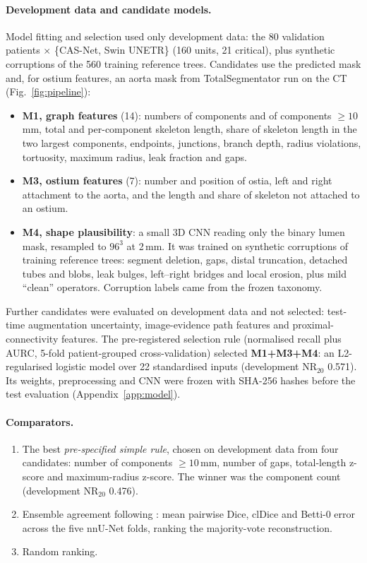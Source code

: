\documentclass[11pt]{article}
\newcommand{\NR}{\mathrm{NR}_{20}}
\begin{document}
\paragraph{Development data and candidate models.} Model fitting and selection used only development data: the 80 validation patients $\times$ \{CAS-Net, Swin UNETR\} (160 units, 21 critical), plus synthetic corruptions of the 560 training reference trees. Candidates use the predicted mask and, for ostium features, an aorta mask from TotalSegmentator \citep{wasserthal2023totalseg} run on the CT (Fig.~\ref{fig:pipeline}):
\begin{itemize}
\item \textbf{M1, graph features} (14): numbers of components and of components $\geq 10$\,mm, total and per-component skeleton length, share of skeleton length in the two largest components, endpoints, junctions, branch depth, radius violations, tortuosity, maximum radius, leak fraction and gaps.
\item \textbf{M3, ostium features} (7): number and position of ostia, left and right attachment to the aorta, and the length and share of skeleton not attached to an ostium.
\item \textbf{M4, shape plausibility}: a small 3D CNN reading only the binary lumen mask, resampled to $96^3$ at 2\,mm. It was trained on synthetic corruptions of training reference trees: segment deletion, gaps, distal truncation, detached tubes and blobs, leak bulges, left--right bridges and local erosion, plus mild ``clean'' operators. Corruption labels came from the frozen taxonomy.
\end{itemize}
Further candidates were evaluated on development data and not selected: test-time augmentation uncertainty, image-evidence path features and proximal-connectivity features. The pre-registered selection rule (normalised recall plus AURC, 5-fold patient-grouped cross-validation) selected \textbf{M1+M3+M4}: an L2-regularised logistic model over 22 standardised inputs (development $\NR$ 0.571). Its weights, preprocessing and CNN were frozen with SHA-256 hashes before the test evaluation (Appendix~\ref{app:model}).

\paragraph{Comparators.}
\begin{enumerate}
\item[(i)] The best \emph{pre-specified simple rule}, chosen on development data from four candidates: number of components $\geq 10$\,mm, number of gaps, total-length z-score and maximum-radius z-score. The winner was the component count (development $\NR$ 0.476).
\item[(ii)] Ensemble agreement following \citet{zenk2025failure}: mean pairwise Dice, clDice \citep{shit2021cldice} and Betti-0 error across the five nnU-Net folds, ranking the majority-vote reconstruction.
\item[(iii)] Random ranking.
\end{enumerate}
\end{document}
